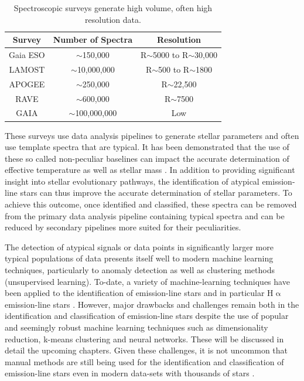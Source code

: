 \begin{table}[!htb]
\begin{center}
\begin{tabular}{|c|c|c|}
\hline
\textbf{Survey} & \textbf{Number of Spectra} & \textbf{Resolution} \\ \hline
Gaia ESO        & $\sim$150,000              & R$\sim$5000 to R$\sim$30,000             \\ \hline
LAMOST          & $\sim$10,000,000           & R$\sim$500 to R$\sim$1800              \\ \hline
APOGEE          & $\sim$250,000              & R$\sim$22,500             \\ \hline
RAVE            & $\sim$600,000              & R$\sim$7500                 \\ \hline
GAIA            & $\sim$100,000,000          & Low                 \\ \hline
\end{tabular}
\caption{Spectroscopic surveys generate high volume, often high resolution data.}
\label{table:draglift1}
\end{center}
\end{table}
These surveys use data analysis pipelines to generate stellar parameters and often use template spectra that are typical. It has been demonstrated that the use of these so called non-peculiar baselines can impact the accurate determination of effective temperature \cite{cayrel2011halpha}\cite{amarsi2018effective}\cite{giribaldi2019accurate} as well as stellar mass \cite{ness2016spectroscopic}\cite{bergemann2016gaia}. In addition to providing significant insight into stellar evolutionary pathways, the identification of atypical emission-line stars can thus improve the accurate determination of stellar parameters. To achieve this outcome, once identified and classified, these spectra can be removed from the primary data analysis pipeline containing typical spectra and can be reduced by secondary pipelines more suited for their peculiarities. 

The detection of atypical signals or data points in significantly larger more typical populations of data presents itself well to modern machine learning techniques, particularly to anomaly detection as well as clustering methods (unsupervised learning). To-date, a variety of machine-learning techniques have been applied to the identification of emission-line stars and in particular H$\upalpha$ emission-line stars . However, major drawbacks and challenges remain both in the identification and classification of emission-line stars despite the use of popular and seemingly robust machine learning techniques such as dimensionality reduction, k-means clustering and neural networks. These will be discussed in detail the upcoming chapters. Given these challenges, it is not uncommon that manual methods are still being used for the identification and classification of emission-line stars even in modern data-sets with thousands of stars \cite{zhang2021catalog}. 

